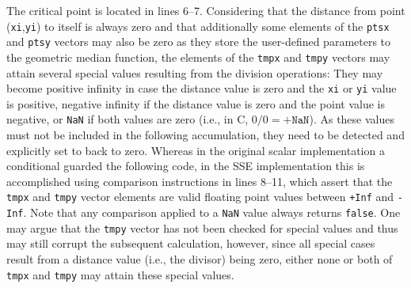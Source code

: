 The critical point is located in lines 6--7. Considering that the distance from point (\texttt{xi},\texttt{yi}) to itself is always zero and that additionally some elements of the \texttt{ptsx} and \texttt{ptsy} vectors may also be zero as they store the user-defined parameters to the geometric median function, the elements of the \texttt{tmpx} and \texttt{tmpy} vectors may attain several special values resulting from the division operations: They may become positive infinity in case the distance value is zero and the \texttt{xi} or \texttt{yi} value is positive, negative infinity if the distance value is zero and the point value is negative, or \texttt{NaN} if both values are zero (i.e., in C, $0 / 0 = \texttt{+NaN}$). As these values must not be included in the following accumulation, they need to be detected and explicitly set to back to zero. Whereas in the original scalar implementation a conditional guarded the following code, in the SSE implementation this is accomplished using comparison instructions in lines 8--11, which assert that the \texttt{tmpx} and \texttt{tmpy} vector elements are valid floating point values between \texttt{+Inf} and \texttt{-Inf}. Note that any comparison applied to a \texttt{NaN} value always returns \texttt{false}. One may argue that the \texttt{tmpy} vector has not been checked for special values and thus may still corrupt the subsequent calculation, however, since all special cases result from a distance value (i.e., the divisor) being zero, either none or both of \texttt{tmpx} and \texttt{tmpy} may attain these special values.


